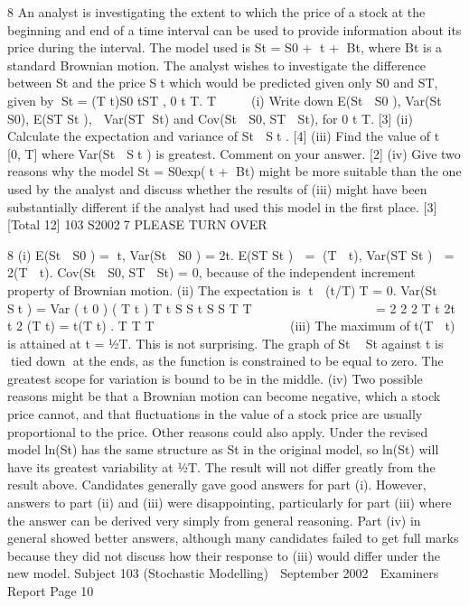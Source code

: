 

8 An analyst is investigating the extent to which the price of a stock at the beginning
and end of a time interval can be used to provide information about its price during
the interval. The model used is
St = S0 + t + Bt,
where Bt is a standard Brownian motion. The analyst wishes to investigate the
difference between St and the price St which would be predicted given only S0 and
ST, given by
St = (T t)S0 tST , 0 t T.
T
 
 
(i) Write down E(St  S0 ), Var(St  S0), E(ST St ),  Var(ST St) and
Cov(St  S0, ST  St), for 0 
 t 
 T. [3]
(ii) Calculate the expectation and variance of St  St . [4]
(iii) Find the value of t  [0, T] where Var(St  St ) is greatest. Comment on your
answer. [2]
(iv) Give two reasons why the model
St = S0exp(t + Bt)
might be more suitable than the one used by the analyst and discuss whether
the results of (iii) might have been substantially different if the analyst had
used this model in the first place. [3]
[Total 12]
103 S20027 PLEASE TURN OVER



8 (i) E(St  S0 ) = t, Var(St  S0 ) =	
2t.
E(ST St )  = (T  t), Var(ST St )  = 	2(T  t).
Cov(St  S0, ST  St) = 0, because of the independent increment property of
Brownian motion.
(ii) The expectation is t  (t/T)T = 0.
Var(St  St ) = Var ( t 0 ) ( T t )
T t S S t S S
T T
    
      
   
=
2 2 2
T t 2t t 2 (T t) = t(T t) .
T T T
      
       
 	  	
(iii) The maximum of t(T  t) is attained at t = ½T.
This is not surprising. The graph of St  St against t is tied down at the ends,
as the function is constrained to be equal to zero. The greatest scope for
variation is bound to be in the middle.
(iv) Two possible reasons might be that a Brownian motion can become negative,
which a stock price cannot, and that fluctuations in the value of a stock price
are usually proportional to the price. Other reasons could also apply.
Under the revised model ln(St) has the same structure as St in the original
model, so ln(St) will have its greatest variability at ½T. The result will not
differ greatly from the result above.
Candidates generally gave good answers for part (i). However, answers to part (ii) and (iii)
were disappointing, particularly for part (iii) where the answer can be derived very simply
from general reasoning. Part (iv) in general showed better answers, although many
candidates failed to get full marks because they did not discuss how their response to (iii)
would differ under the new model.
Subject 103 (Stochastic Modelling)  September 2002  Examiners Report
Page 10
